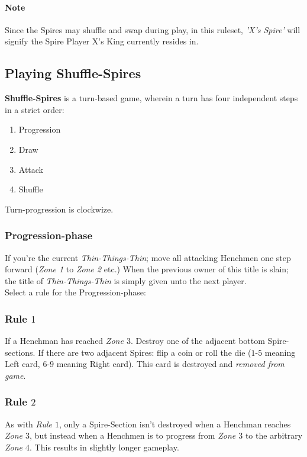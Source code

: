 \documentclass[11pt,twocolumn]{article}
\begin{document}
\paragraph{Note}
Since the Spires may shuffle and swap during play, in this ruleset, \textit{'X's Spire'} will signify the Spire Player X's King currently resides in.

\subsection{Playing Shuffle-Spires}
\label{sec:playingshufflespires}
\textbf{Shuffle-Spires} is a turn-based game, wherein a turn has four independent steps in a strict order:
\begin{enumerate}[noitemsep]
\item  Progression
\item Draw
\item Attack
\item Shuffle
\end{enumerate}
Turn-progression is clockwize.

\subsubsection{Progression-phase}
\label{sec:playingshufflespires_progressionphase}
If you’re the current \textit{Thin-Things-Thin}; move all attacking Henchmen one step forward (\textit{Zone 1} to \textit{Zone 2} etc.)
When the previous owner of this title is slain; the title of \textit{Thin-Things-Thin} is simply given unto the next player.\\

\noindent
Select a rule for the Progression-phase:
\subsubsection{Rule $1$}
If a Henchman has reached \textit{Zone $3$}. Destroy one of the adjacent bottom Spire-sections.
If there are two adjacent Spires: flip a coin or roll the die ($1$-$5$ meaning Left card, $6$-$9$ meaning Right card).
This card is destroyed and \textit{removed from game}.
\subsubsection{Rule $2$}
As with \textit{Rule $1$}, only a Spire-Section isn’t destroyed when a Henchman reaches \textit{Zone $3$}, but instead when a Henchmen is to progress from \textit{Zone $3$} to the arbitrary \textit{Zone $4$}.
This results in slightly longer gameplay.\\
\end{document}
